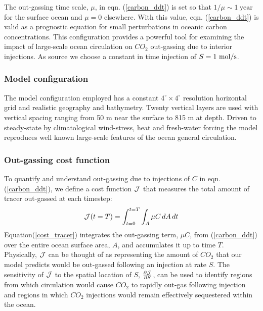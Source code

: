 The out-gassing time scale, $\mu$, in eqn. (\ref{carbon_ddt})
is set so that \( 1/\mu \sim 1 \ \mathrm{year} \) for the surface
ocean and $\mu=0$ elsewhere. With this value, eqn. (\ref{carbon_ddt})
is valid as a prognostic equation for small perturbations in oceanic 
carbon concentrations. This configuration provides a 
powerful tool for examining the impact of large-scale ocean circulation
on $ CO_2 $ out-gassing due to interior injections.
As source we choose a constant in time injection of 
$ S = 1 \,\, {\rm mol / s}$.

\subsubsection{Model configuration}
\label{www:tutorials}

The model configuration employed has a constant 
$4^\circ \times 4^\circ$ resolution horizontal grid and realistic 
geography and bathymetry. Twenty vertical layers are used with 
vertical spacing ranging
from 50 m near the surface to 815 m at depth. 
Driven to steady-state by climatological wind-stress, heat and
fresh-water forcing the model reproduces well known large-scale
features of the ocean general circulation. 

\subsubsection{Out-gassing cost function}
\label{www:tutorials}

To quantify and understand out-gassing due to injections of $C$
in eqn. (\ref{carbon_ddt}),
we define a cost function $ {\cal J} $ that measures the total amount of 
tracer out-gassed at each timestep:
%
\begin{equation}
\label{cost_tracer}
{\cal J}(t=T)=\int_{t=0}^{t=T}\int_{A} \mu C \, dA \, dt
\end{equation}
%
Equation(\ref{cost_tracer}) integrates the out-gassing term, $\mu C$, 
from (\ref{carbon_ddt})
over the entire ocean surface area, $A$, and accumulates it 
up to time $T$.
Physically, ${\cal J}$ can be thought of as representing the amount of 
$CO_2$ that our model predicts would be out-gassed following an
injection at rate $S$.
The sensitivity of ${\cal J}$ to the spatial location of $S$, 
$\frac{\partial {\cal J}}{\partial S}$,
can be used to identify regions from which circulation
would cause $CO_2$ to rapidly out-gas following injection
and regions in which $CO_2$ injections would remain effectively 
sequestered within the ocean.

